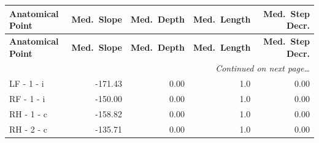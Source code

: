 \documentclass[a4paper,11pt]{article}
\begin{document}
\begin{small}
\begin{longtable}{p{4.5cm}rrrr}
\toprule
\textbf{Anatomical Point} &
\textbf{Med.\ Slope} &
\textbf{Med.\ Depth} &
\textbf{Med.\ Length} &
\textbf{Med.\ Step Decr.} \\
\midrule
\endfirsthead
\toprule
\textbf{Anatomical Point} &
\textbf{Med.\ Slope} &
\textbf{Med.\ Depth} &
\textbf{Med.\ Length} &
\textbf{Med.\ Step Decr.} \\
\midrule
\endhead
\midrule
\multicolumn{5}{r}{\small\emph{Continued on next page\ldots}} \\
\endfoot
\bottomrule
\endlastfoot
LF - 1 - i & -171.43 & 0.00 & 1.0 & 0.00 \\
RF - 1 - i & -150.00 & 0.00 & 1.0 & 0.00 \\
RH - 1 - c & -158.82 & 0.00 & 1.0 & 0.00 \\
RH - 2 - c & -135.71 & 0.00 & 1.0 & 0.00 \\
\end{longtable}
\end{small}
\end{document}
